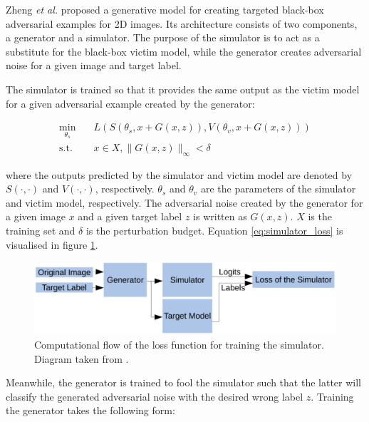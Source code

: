 Zheng \textit{et al.} \cite{zheng_black_box_GAN} proposed a generative model for creating targeted black-box adversarial examples for 2D images. Its architecture consists of two components, a generator and a simulator. The purpose of the simulator is to act as a substitute for the black-box victim model, while the generator creates adversarial noise for a given image and target label.

The simulator is trained so that it provides the same output as the victim model for a given adversarial example created by the generator:

\begin{equation}
\begin{aligned}
\min_{\theta_s} \quad & L(S(\theta_s, x + G(x, z)),V(\theta_v, x + G(x, z)))\\
\textrm{s.t.} \quad & x \in X, \|G(x, z)\|_\infty < \delta
\label{eq:simulator_loss}
\end{aligned}
\end{equation}

\noindent where the outputs predicted by the simulator and victim model are denoted by $S(\cdot,\cdot)$ and $V(\cdot,\cdot)$, respectively. $\theta_s$ and $\theta_v$ are the parameters of the simulator and victim model, respectively. The adversarial noise created by the generator for a given image $x$ and a given target label $z$ is written as $G(x,z)$. $X$ is the training set and $\delta$ is the perturbation budget. Equation \ref{eq:simulator_loss} is visualised in figure \ref{fig:simulator_loss}.

\begin{figure}[h]
    \centering
    \includegraphics[width=1\textwidth]{graphics/simulator_loss.JPG}
    \caption{Computational flow of the loss function for training the simulator. Diagram taken from \cite{zheng_black_box_GAN}.}
    \label{fig:simulator_loss}
\end{figure}

Meanwhile, the generator is trained to fool the simulator such that the latter will classify the generated adversarial noise with the desired wrong label $z$. Training the generator takes the following form:

